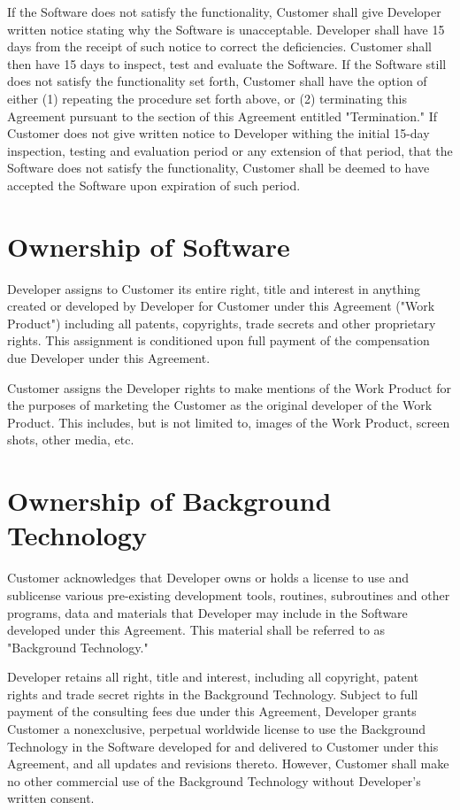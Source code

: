 \documentclass[11pt]{article}
\begin{document}
If the Software does not satisfy the functionality, Customer shall give Developer written notice stating why the Software is unacceptable. Developer shall have 15 days from the receipt of such notice to correct the deficiencies. Customer shall then have 15 days to inspect, test and evaluate the Software. If the Software still does not satisfy the functionality set forth, Customer shall have the option of either (1) repeating the procedure set forth above, or (2) terminating this Agreement pursuant to the section of this Agreement entitled "Termination." If Customer does not give written notice to Developer withing the initial 15-day inspection, testing and evaluation period or any extension of that period, that the Software does not satisfy the functionality, Customer shall be deemed to have accepted the Software upon expiration of such period.
\section{Ownership of Software}
Developer assigns to Customer its entire right, title and interest in anything created or developed by Developer for Customer under this Agreement ("Work Product") including all patents, copyrights, trade secrets and other proprietary rights. This assignment is conditioned upon full payment of the compensation due Developer under this Agreement. 

Customer assigns the Developer rights to make mentions of the Work Product for the purposes of marketing the Customer as the original developer of the Work Product. This includes, but is not limited to, images of the Work Product, screen shots, other media, etc.
\section{Ownership of Background Technology}
Customer acknowledges that Developer owns or holds a license to use and sublicense various pre-existing development tools, routines, subroutines and other programs, data and materials that Developer may include in the Software developed under this Agreement. This material shall be referred to as "Background Technology."  

Developer retains all right, title and interest, including all copyright, patent rights and trade secret rights in the Background Technology. Subject to full payment of the consulting fees due under this Agreement, Developer grants Customer a nonexclusive, perpetual worldwide license to use the Background Technology in the Software developed for and delivered to Customer under this Agreement, and all updates and revisions thereto. However, Customer shall make no other commercial use of the Background Technology without Developer’s written consent.
\end{document}

